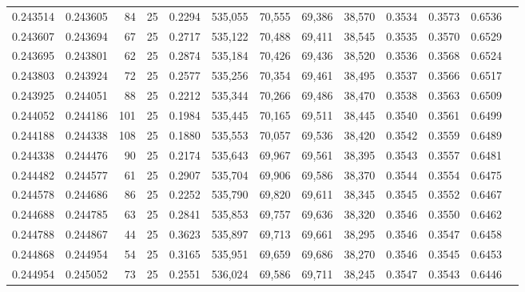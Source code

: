 \begin{tabular}{rrrrrrrrrrrrr}
0.243514 & 0.243605 &    84 &  25 &                                     0.2294 & 535,055 &  70,555 &  69,386 &  38,570 & 0.3534 & 0.3573 & 0.6536 \\
0.243607 & 0.243694 &    67 &  25 &                                     0.2717 & 535,122 &  70,488 &  69,411 &  38,545 & 0.3535 & 0.3570 & 0.6529 \\
0.243695 & 0.243801 &    62 &  25 &                                     0.2874 & 535,184 &  70,426 &  69,436 &  38,520 & 0.3536 & 0.3568 & 0.6524 \\
0.243803 & 0.243924 &    72 &  25 &                                     0.2577 & 535,256 &  70,354 &  69,461 &  38,495 & 0.3537 & 0.3566 & 0.6517 \\
0.243925 & 0.244051 &    88 &  25 &                                     0.2212 & 535,344 &  70,266 &  69,486 &  38,470 & 0.3538 & 0.3563 & 0.6509 \\
0.244052 & 0.244186 &   101 &  25 &                                     0.1984 & 535,445 &  70,165 &  69,511 &  38,445 & 0.3540 & 0.3561 & 0.6499 \\
0.244188 & 0.244338 &   108 &  25 &                                     0.1880 & 535,553 &  70,057 &  69,536 &  38,420 & 0.3542 & 0.3559 & 0.6489 \\
0.244338 & 0.244476 &    90 &  25 &                                     0.2174 & 535,643 &  69,967 &  69,561 &  38,395 & 0.3543 & 0.3557 & 0.6481 \\
0.244482 & 0.244577 &    61 &  25 &                                     0.2907 & 535,704 &  69,906 &  69,586 &  38,370 & 0.3544 & 0.3554 & 0.6475 \\
0.244578 & 0.244686 &    86 &  25 &                                     0.2252 & 535,790 &  69,820 &  69,611 &  38,345 & 0.3545 & 0.3552 & 0.6467 \\
0.244688 & 0.244785 &    63 &  25 &                                     0.2841 & 535,853 &  69,757 &  69,636 &  38,320 & 0.3546 & 0.3550 & 0.6462 \\
0.244788 & 0.244867 &    44 &  25 &                                     0.3623 & 535,897 &  69,713 &  69,661 &  38,295 & 0.3546 & 0.3547 & 0.6458 \\
0.244868 & 0.244954 &    54 &  25 &                                     0.3165 & 535,951 &  69,659 &  69,686 &  38,270 & 0.3546 & 0.3545 & 0.6453 \\
0.244954 & 0.245052 &    73 &  25 &                                     0.2551 & 536,024 &  69,586 &  69,711 &  38,245 & 0.3547 & 0.3543 & 0.6446 \\

\end{tabular}
